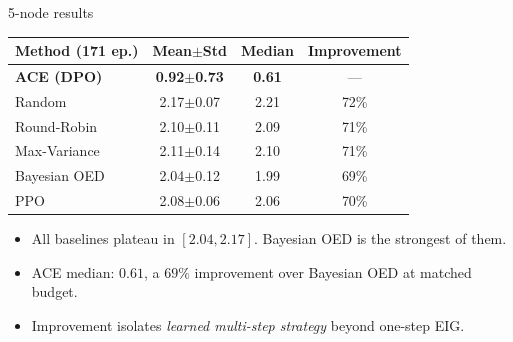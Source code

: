 \documentclass[aspectratio=169,10pt]{beamer}
\begin{document}
\begin{frame}{5-node results}
\centering
\small
\begin{tabular}{@{}lccc@{}}
\toprule
Method (171 ep.) & Mean$\pm$Std & Median & Improvement \\
\midrule
\textbf{ACE (DPO)} & \textbf{0.92$\pm$0.73} & \textbf{0.61} & --- \\
\midrule
Random         & 2.17$\pm$0.07 & 2.21 & 72\% \\
Round-Robin    & 2.10$\pm$0.11 & 2.09 & 71\% \\
Max-Variance   & 2.11$\pm$0.14 & 2.10 & 71\% \\
Bayesian OED   & 2.04$\pm$0.12 & 1.99 & 69\% \\
PPO            & 2.08$\pm$0.06 & 2.06 & 70\% \\
\bottomrule
\end{tabular}
\vspace{0.5em}
\begin{itemize}
\item All baselines plateau in $[2.04, 2.17]$. Bayesian OED is the strongest of them.
\item ACE median: $0.61$, a $69\%$ improvement over Bayesian OED at matched budget.
\item Improvement isolates \emph{learned multi-step strategy} beyond one-step EIG.
\end{itemize}
\end{frame}
\end{document}
